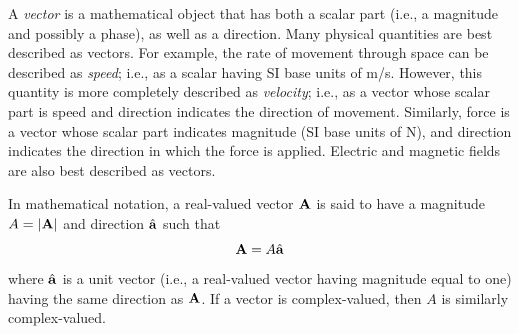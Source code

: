 

\label{m0006_Vector_Arithmetic} %

A \emph{vector} 
is a mathematical object that has both a scalar part (i.e., a magnitude and possibly a phase), as well as a direction.
Many physical quantities are best described as vectors.
For example, the rate of movement through space can be described as \emph{speed}; i.e., as a scalar having SI base units of m/s.
However, this quantity is more completely described as \emph{velocity}; 
i.e., as a vector whose scalar part is speed and direction indicates the direction of movement.
Similarly, force 
is a vector whose scalar part indicates magnitude (SI base units of N), and direction indicates the direction in which the force is applied.
Electric and magnetic fields are also best described as vectors. 

In mathematical notation, a real-valued vector ${\bf A}$ is said to have a magnitude $A=\left|{\bf A}\right|$ and direction $\hat{\bf a}$ such that
%
\begin{equation}
{\bf A} = A \hat{\bf a}
\end{equation}
%
where $\hat{\bf a}$ is a unit vector 
(i.e., a real-valued vector having magnitude equal to one) having the same direction as ${\bf A}$.
If a vector is complex-valued, then $A$ is similarly complex-valued.

